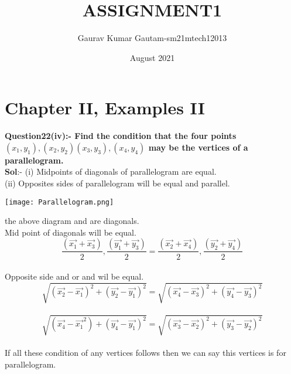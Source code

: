 \documentclass[12pt]{article}
\title{ASSIGNMENT1}
\author{Gaurav Kumar Gautam-sm21mtech12013}\\
\date{August 2021}
\begin{document}
\maketitle
\section*{Chapter II, Examples II}


\textbf{ Question22(iv):- Find the condition that the four points $(x_1,y_1),(x_2,y_2)(x_3,y_3),(x_4,y_4)$ may be the vertices of a parallelogram.}\\[6pt]
\textbf{Sol}:- (i) Midpoints of diagonals of parallelogram are equal.\\[6pt]
 (ii) Opposites sides of parallelogram will be equal and parallel.
 \begin{center}
     \texttt{[image: Parallelogram.png]}
 \end{center}
\In the above diagram  and  are diagonals.\\
Mid point of diagonals will be equal.
$$\frac{(\vec{x_1}+\vec{x_3})}{2},\frac{(\vec{y_1}+\vec{y_3})}{2}=\frac{(\vec{x_2}+\vec{x_4})}{2},\frac{(\vec{y_2}+\vec{y_4})}{2}$$\\
Opposite side  and  or  and   wil be equal.\\
$$\sqrt{(\vec{x_2}-\vec{x_1})^2 + (\vec{y_2}-\vec{y_1})^2}=\sqrt{(\vec{x_4}-\vec{x_3})^2 + (\vec{y_4}-\vec{y_3})^2}$$\\
$$\sqrt{(\vec{x_4}-\vec{x_1}^2) + (\vec{y_4}-\vec{y_1})^2}=\sqrt{(\vec{x_3}-\vec{x_2})^2+(\vec{y_3}-\vec{y_2})^2}$$\\
If all these condition of any vertices follows then we can say this vertices is for parallelogram.
\end{document}
